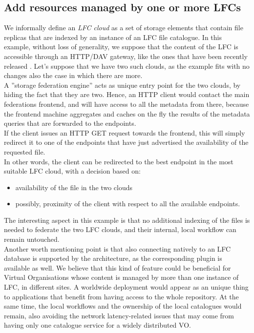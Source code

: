 \documentclass[12pt]{article} %
\begin{document}
\subsection{Add resources managed by one or more LFCs}

We informally define an \textit{LFC cloud} as a set of storage elements that contain file replicas that are indexed by an instance of an LFC file catalogue. In this example, without loss of generality, we suppose that the content of the LFC is accessible through an HTTP/DAV gateway, like the ones that have been recently released \cite{dpmfuture}.
Let’s suppose that we have two such clouds, as the example fits with no changes also the case in which there are more.\\

A ''storage federation engine'' acts as unique entry point for the two clouds, by hiding the fact that they are two. Hence, an HTTP client would contact the main federations frontend, and will have access to all the metadata from there, because the frontend machine aggregates and caches on the fly the results of the metadata queries that are forwarded to the endpoints.\\
If the client issues an HTTP GET request towards the frontend, this will simply redirect it to one of the endpoints that have just advertised the availability of the requested file.\\ In other words, the client can be redirected to the best endpoint in the most suitable LFC cloud, with a decision based on:
\begin{itemize}
\item availability of the file in the two clouds
\item possibly, proximity of the client with respect to all the available endpoints.
\end{itemize}
The interesting aspect in this example is that no additional indexing of the files is needed to federate the two LFC clouds, and their internal, local workflow can remain untouched. \\
Another worth mentioning point is that also connecting natively to an LFC database is supported by the architecture, as the corresponding plugin is available as well.
We believe that this kind of feature could be beneficial for Virtual Organisations whose content is managed by more than one instance of LFC, in different sites. A worldwide deployment would appear as an unique thing to applications that benefit from having access to the whole repository. At the same time, the local workflows and the ownership of the local catalogues would remain, also avoiding the network latency-related issues that may come from having only one catalogue service for a widely distributed VO.
\end{document}
